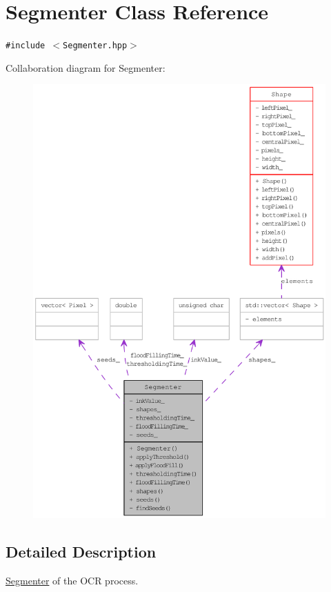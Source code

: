\hypertarget{class_segmenter}{
\section{Segmenter Class Reference}
\label{class_segmenter}
}
{\tt \#include $<$Segmenter.hpp$>$}

Collaboration diagram for Segmenter:\nopagebreak
\begin{figure}[H]
\begin{center}
\leavevmode
\includegraphics[width=400pt]{class_segmenter__coll__graph}
\end{center}
\end{figure}


\subsection{Detailed Description}
\hyperlink{class_segmenter}{Segmenter} of the OCR process. 

